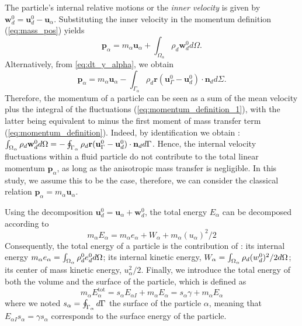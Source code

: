 The particle's internal relative motions or the \textit{inner velocity} is given by $\textbf{w}_d^0 = \textbf{u}_d^0 - \textbf{u}_\alpha$. 
Substituting the inner velocity in the momentum definition (\ref{eq:mass_pos}) yields
\begin{equation}
    \label{eq:momentum_definition_1}
    \textbf{p}_\alpha
    = m_\alpha \textbf{u}_\alpha
    + \int_{\Omega_\alpha} \rho_d \textbf{w}_d^0 d\Omega.
\end{equation}
Alternatively, from \eqref{eq:dt_y_alpha}, we obtain
\begin{equation}
    \textbf{p}_\alpha
    =  m_\alpha \textbf{u}_\alpha
    - \int_{\Gamma_\alpha} \rho_d\textbf{r}(\textbf{u}_\Gamma^0 - \textbf{u}_d^0)\cdot \textbf{n}_d d\Sigma.
    \label{eq:momentum_definition}
\end{equation}
Therefore, the momentum of a particle can be seen as a sum of the mean velocity plus the integral of the fluctuations (\ref{eq:momentum_definition_1}), with the latter being equivalent to minus the first moment of mass transfer term (\ref{eq:momentum_definition}).
Indeed, by identification we obtain : $\int_{\Omega_{\alpha}}  \rho_d \textbf{w}_d^0  d\Omega = - \oint_{\Gamma_{\alpha}}   \rho_d\textbf{r} (\textbf{u}_\Gamma^0 - \textbf{u}_d^0)\cdot \textbf{n}_d  d\Gamma$. 
Hence, the internal velocity fluctuations within a fluid particle do not contribute to the total linear momentum $\textbf{p}_\alpha$, as long as the anisotropic mass transfer is negligible.  
In this study, we assume this to be the case, therefore, we can consider the classical relation $\textbf{p}_\alpha = m_\alpha \textbf{u}_\alpha$. 


Using the decomposition $\textbf{u}_d^0 = \textbf{u}_\alpha + \textbf{w}_d^0$, the total energy $E_\alpha$ can be decomposed according to
\begin{equation*}
    \label{eq:E_alpha_def}
    m_\alpha E_\alpha
    = m_\alpha e_\alpha 
    + W_\alpha
    + m_\alpha (u_\alpha)^2/2
\end{equation*}
Consequently, the total energy of a particle is the contribution of :
its internal energy $m_\alpha e_\alpha = \int_{\Omega_{\alpha}} \rho_d^0 e_d^0 d\Omega$; 
its internal kinetic energy, $W_\alpha =  \int_{\Omega_{\alpha}} \rho_d  (w_d^0)^2/2  d\Omega$;
its center of mass kinetic energy, $u_\alpha^2/2$. 
Finally, we introduce the total energy of both the volume and the surface of the particle, which is defined as 
\begin{equation*}
    m_\alpha E_\alpha^\text{tot}
    = 
    s_\alpha  E_{\alpha I}
    + m_\alpha E_\alpha
    = 
    s_\alpha \gamma 
    + m_\alpha E_\alpha
\end{equation*}
where we noted $s_\alpha = \oint_{\Gamma_{\alpha}}  d\Gamma$ the surface of the particle $\alpha$, meaning that $E_{\alpha I} s_\alpha = \gamma s_\alpha $ corresponds to the surface energy of the particle. 


